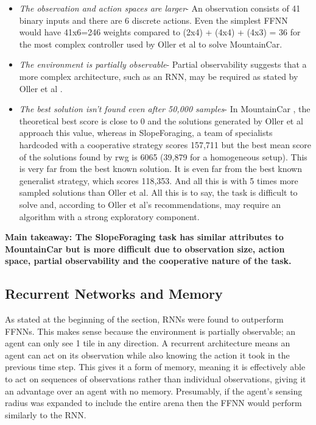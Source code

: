 \documentclass[12pt]{article}
\begin{document}
\begin{itemize}
\item \textit{The observation and action spaces are larger}- An observation consists of 41 binary inputs and there are 6 discrete actions. 
Even the simplest FFNN would have 41x6=246 weights compared to (2x4) + (4x4) + (4x3) = 36 for the most complex controller used by Oller et al to solve MountainCar. 

\item \textit{The environment is partially observable}- Partial observability suggests that a more complex architecture, such as an RNN, may be required as stated by Oller et al \cite{oller:AAMAS:2020}.

\item \textit{The best solution isn't found even after 50,000 samples}- In MountainCar \cite{MountainCar}, the theoretical best score is close to 0 and the solutions generated by Oller et al approach this value, whereas in SlopeForaging, a team of specialists hardcoded with a cooperative strategy scores 157,711 but the best mean score of the solutions found by rwg is 6065 (39,879 for a homogeneous setup). 
This is very far from the best known solution. 
It is even far from the best known generalist strategy, which scores 118,353. 
And all this is with 5 times more sampled solutions than Oller et al. 
All this is to say, the task is difficult to solve and, according to Oller et al's recommendations, may require an algorithm with a strong exploratory component.

\end{itemize}

\textbf{Main takeaway: The SlopeForaging task has similar attributes to MountainCar but is more difficult due to observation size, action space, partial observability and the cooperative nature of the task.}
		
\subsection{Recurrent Networks and Memory} \label{RNN Architecture}

As stated at the beginning of the section, RNNs were found to outperform FFNNs. 
This makes sense because the environment is partially observable; an agent can only see 1 tile in any direction. 
A recurrent architecture means an agent can act on its observation while also knowing the action it took in the previous time step.
This gives it a form of memory, meaning it is effectively able to act on sequences of observations rather than individual observations, giving it an advantage over an agent with no memory. 
Presumably, if the agent's sensing radius was expanded to include the entire arena then the FFNN would perform similarly to the RNN. \\ 
\end{document}
